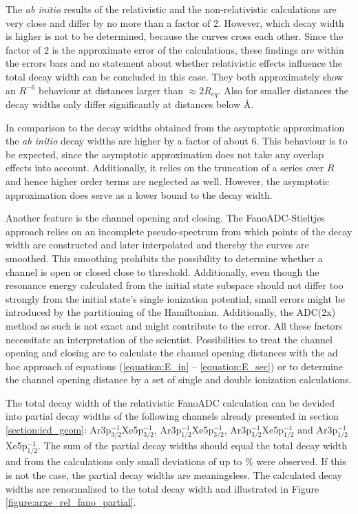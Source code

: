 The \textit{ab initio} results of the relativistic and the non-relativistic
calculations are very close and differ by no more than a factor of 2.
However, which decay width is higher is not to be determined, because the
curves cross each other.
Since the factor of 2 is the approximate error of the calculations,
these findings are within the errors bars and no statement
about whether relativistic effects influence the total decay width can be
concluded in this case.
They both approximately show an $R^{-6}$ behaviour at distances larger than
$\approx 2R_{eq}$. Also for smaller distances the decay widths only differ
significantly at distances below \unit[5]{\AA}.

In comparison to the decay widths obtained from the asymptotic approximation the
\textit{ab initio} decay widths are higher by a factor of about 6. This behaviour
is to be expected, since the asymptotic approximation does not take any overlap
effects into account. Additionally, it relies on the truncation of a series over
$R$ and hence higher order terms are neglected as well. However, the asymptotic
approximation does serve as a lower bound to the decay width.

Another feature is the channel opening and closing. The FanoADC-Stieltjes
approach relies on an incomplete pseudo-spectrum from which points of the
decay width are constructed and later interpolated and thereby the curves are
smoothed. This smoothing prohibits the possibility to determine whether a channel
is open or closed close to threshold. Additionally, even though the resonance energy
calculated from the initial state subspace should not differ too strongly from the
initial state's single ionization potential, small errors might be introduced by
the partitioning of the Hamiltonian. Additionally, the \ac{ADC}(2x) method as such
is not exact and might contribute to the error. All these factors necessitate
an interpretation of the scientist.
Possibilities to treat the channel opening and closing are to calculate the
channel opening distances with the ad hoc approach of equations (\ref{equation:E_in}
-- \ref{equation:E_sec}) or to determine the channel opening distance by a set of
single and double ionization calculations.


The total decay width of the relativistic FanoADC calculation can be devided
into partial decay widths of the following channels already presented in
section \ref{section:icd_geom}: Ar3p$_{3/2}^{-1}$Xe5p$_{3/2}^{-1}$,
Ar3p$_{1/2}^{-1}$Xe5p$_{3/2}^{-1}$, Ar3p$_{3/2}^{-1}$Xe5p$_{1/2}^{-1}$ and
Ar3p$_{1/2}^{-1}$Xe5p$_{1/2}^{-1}$. The sum of the partial decay widths should
equal the total decay width and from the calculations only small deviations
of up to \unit[10]{\%} were observed. If this is not the case, the
partial decay widths are meaningsless. The calculated decay widths are renormalized
to the total decay width and illustrated in
Figure \ref{figure:arxe_rel_fano_partial}.

